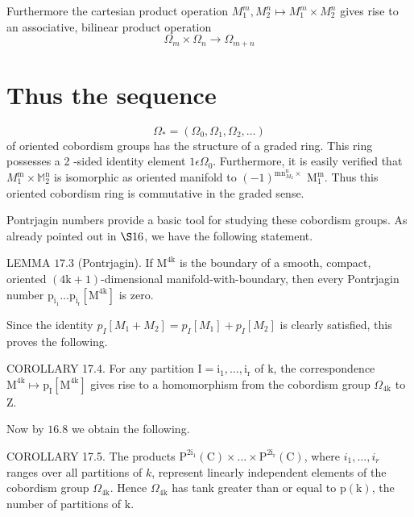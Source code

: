 \documentclass[10pt]{article}
\begin{document}
Furthermore the cartesian product operation $M_{1}^{m}, M_{2}^{n} \mapsto M_{1}^{m} \times M_{2}^{n}$ gives rise to an associative, bilinear product operation
$$
\Omega_{m} \times \Omega_{n} \rightarrow \Omega_{m+n}
$$

\section{Thus the sequence}
$$
\Omega_{*}=\left(\Omega_{0}, \Omega_{1}, \Omega_{2}, \ldots\right)
$$
of oriented cobordism groups has the structure of a graded ring. This ring possesses a 2 -sided identity element $1 \epsilon \Omega_{0}$. Furthermore, it is easily verified that $M_{1}^{\mathrm{m}} \times \mathbb{M}_{2}^{\mathrm{n}}$ is isomorphic as oriented manifold to $(-1)^{\mathrm{mn}_{M_{2}}^{\mathrm{n}} \times}$ $\mathrm{M}_{1}^{\mathrm{m}}$. Thus this oriented cobordism ring is commutative in the graded sense.

Pontrjagin numbers provide a basic tool for studying these cobordism groups. As already pointed out in $\S 16$, we have the following statement.

LEMMA $17.3$ (Pontrjagin). If $\mathrm{M}^{4 \mathrm{k}}$ is the boundary of a smooth, compact, oriented $(4 \mathrm{k}+1)$-dimensional manifold-with-boundary, then every Pontrjagin number $\mathrm{p}_{\mathrm{i}_{1}} \ldots \mathrm{p}_{\mathrm{i}_{\mathrm{r}}}\left[\mathrm{M}^{4 \mathrm{k}}\right]$ is zero.

Since the identity $p_{I}\left[M_{1}+M_{2}\right]=p_{I}\left[M_{1}\right]+p_{I}\left[M_{2}\right]$ is clearly satisfied, this proves the following.

COROLLARY 17.4. For any partition $\mathrm{I}=\mathrm{i}_{1}, \ldots, \mathrm{i}_{\mathrm{r}}$ of $\mathrm{k}$, the correspondence $\mathrm{M}^{4 \mathrm{k}} \mapsto \mathrm{p}_{\mathrm{I}}\left[\mathrm{M}^{4 \mathrm{k}}\right]$ gives rise to a homomorphism from the cobordism group $\Omega_{4 \mathrm{k}}$ to $\mathrm{Z}$.

Now by $16.8$ we obtain the following.

COROLLARY 17.5. The products $\mathrm{P}^{2 \mathrm{i}_{1}}(\mathrm{C}) \times \ldots \times \mathrm{P}^{2 \mathrm{i}_{\mathrm{r}}}(\mathrm{C})$, where $i_{1}, \ldots, i_{r}$ ranges over all partitions of $k$, represent linearly independent elements of the cobordism group $\Omega_{4 \mathrm{k}}$. Hence $\Omega_{4 \mathrm{k}}$ has tank greater than or equal to $\mathrm{p}(\mathrm{k})$, the number of partitions of $\mathrm{k}$.
\end{document}
